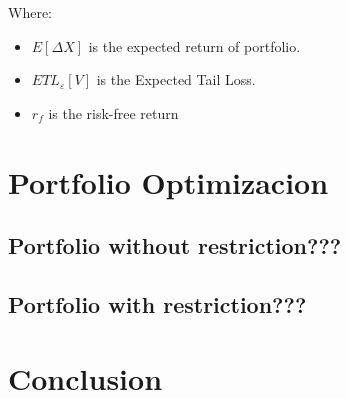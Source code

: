 \documentclass[12pt]{article}
\begin{document}
Where:

\begin{itemize}
\item $E[\Delta X]$ is the expected return of portfolio.
\item $ETL_{\varepsilon}[V]$  is the Expected Tail Loss.
\item $r_{f}$ is the risk-free return
\end{itemize}





\section{Portfolio Optimizacion}





\subsection{Portfolio without restriction???}



\subsection{Portfolio with restriction???}





\section{Conclusion}




\clearpage
\end{document}
